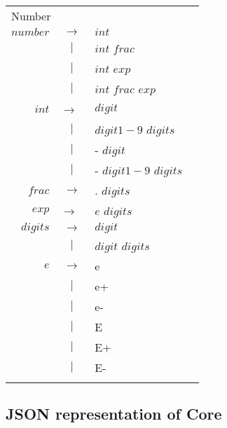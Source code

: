 \begin{footnotesize}
\begin{longtable}{ r c l r }
\multicolumn{4}{l}{Number}		\\
$number$	& $ \rightarrow $ 	& $int$ 				& \\
		& $ | $			& $int$ $frac$				& \\
		& $ | $			& $int$ $exp$				& \\
		& $ | $			& $int$ $frac$ $exp$			& \\
$int$		& $ \rightarrow$ 	& $digit$				& \\
		& $ | $ 		& $digit1-9$ $digits$			& \\
		& $ | $ 		& - $digit$				& \\
		& $ | $ 		& - $digit1-9$ $digits$			& \\
$frac$ 		& $ \rightarrow $ 	& . $digits$ 				& \\
$exp$		& $ \rightarrow $ 	& $e$ $digits$ 				& \\
$digits$	& $ \rightarrow $ 	& $digit$				& \\
		& $ | $ 		& $digit$ $digits$			& \\
$e$		& $ \rightarrow $ 	& e					& \\
		& $ | $ 		& e+					& \\
		& $ | $ 		& e- 					& \\
		& $ | $ 		& E					& \\
		& $ | $ 		& E+					& \\
		& $ | $ 		& E-					& \\
\\[0.01in]

\end{longtable}

\end{footnotesize}

\subsection{JSON representation of Core}


